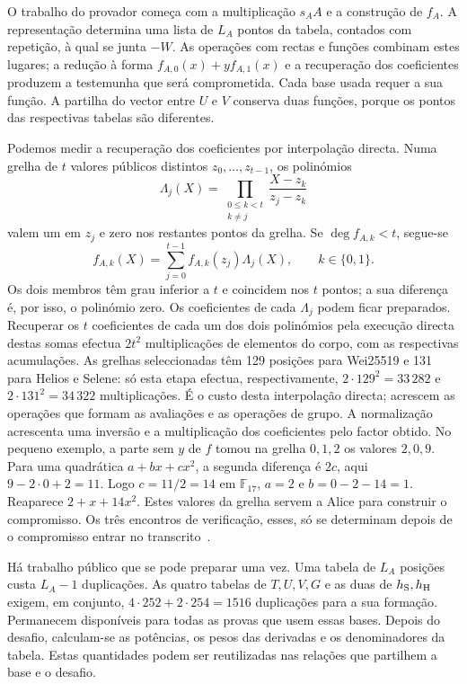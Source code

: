 O trabalho do provador começa com a multiplicação \(s_AA\)
e a construção de \(f_A\). A representação determina uma
lista de \(L_A\) pontos da tabela, contados com repetição,
à qual se junta \(-W\). As operações com rectas e funções
combinam estes lugares; a redução à forma
\(f_{A,0}(x)+yf_{A,1}(x)\) e a recuperação dos coeficientes
produzem a testemunha que será comprometida. Cada base
usada requer a sua função. A partilha do vector entre
\(U\) e \(V\) conserva duas funções, porque os pontos
das respectivas tabelas são diferentes.

Podemos medir a recuperação dos coeficientes por interpolação
directa. Numa grelha de \(t\) valores públicos distintos
\(z_0,\ldots,z_{t-1}\), os polinómios
\[
 \Lambda_j(X)=\prod_{\substack{0\leq k<t\\k\ne j}}
                    \frac{X-z_k}{z_j-z_k}
\]
valem um em \(z_j\) e zero nos restantes pontos da grelha.
Se \(\deg f_{A,k}<t\), segue-se
\[
 f_{A,k}(X)=\sum_{j=0}^{t-1}f_{A,k}(z_j)\Lambda_j(X),
 \qquad k\in\{0,1\}.
\]
Os dois membros têm grau inferior a \(t\) e coincidem nos
\(t\) pontos; a sua diferença é, por isso, o polinómio zero.
Os coeficientes de cada \(\Lambda_j\) podem ficar preparados.
Recuperar os \(t\) coeficientes de cada um dos dois polinómios
pela execução directa destas somas efectua \(2t^2\) multiplicações de elementos
do corpo, com as respectivas acumulações. As grelhas
seleccionadas têm 129 posições para Wei25519 e 131 para
Helios e Selene: só esta etapa efectua, respectivamente,
\(2\cdot129^2=33\,282\) e \(2\cdot131^2=34\,322\)
multiplicações. É o custo desta interpolação directa;
acrescem as operações que formam as avaliações e as
operações de grupo. A normalização acrescenta uma inversão
e a multiplicação dos coeficientes pelo factor obtido.
No pequeno exemplo, a parte sem \(y\) de \(f\) tomou na grelha
\(0,1,2\) os valores \(2,0,9\). Para uma quadrática
\(a+bx+cx^2\), a segunda diferença é \(2c\), aqui
\(9-2\cdot0+2=11\). Logo \(c=11/2=14\) em \(\mathbb F_{17}\),
\(a=2\) e \(b=0-2-14=1\). Reaparece \(2+x+14x^2\).
Estes valores da grelha servem a Alice para construir o compromisso.
Os três encontros de verificação, esses, só se determinam depois de
o compromisso entrar no transcrito~\cite{monero-oxide-fcmp-source}.

Há trabalho público que se pode preparar uma vez. Uma
tabela de \(L_A\) posições custa \(L_A-1\) duplicações.
As quatro tabelas de \(T,U,V,G\) e as duas de
\(h_{\rm S},h_{\rm H}\) exigem, em conjunto,
\(4\cdot252+2\cdot254=1516\) duplicações para a sua
formação. Permanecem disponíveis para todas as provas
que usem essas bases. Depois do desafio, calculam-se as
potências, os pesos das derivadas e os denominadores
da tabela. Estas quantidades podem ser reutilizadas nas
relações que partilhem a base e o desafio.

